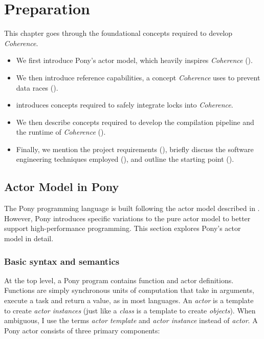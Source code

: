 \chapter{Preparation} \label{ch:preparation}

This chapter goes through the foundational concepts required to develop \textit{Coherence}.

\begin{itemize}
  \item We first introduce Pony's actor model\cite{pony_language}, which heavily inspires \textit{Coherence} ().
  \item We then introduce reference capabilities, a concept \textit{Coherence} uses to prevent data races (). 
  \item {} introduces concepts required to safely integrate locks into \textit{Coherence}.
  \item We then describe concepts required to develop the compilation pipeline and the runtime of \textit{Coherence} ().
  \item Finally, we mention the project requirements (), briefly discuss the software engineering techniques employed (), and outline the starting point ().
\end{itemize}

\section{Actor Model in Pony} \label{sec:actor_model_pony}

The Pony programming language\cite{pony_language} is built following the actor model described in . However, Pony introduces specific variations to the pure actor model to better support high-performance programming. This section explores Pony's actor model in detail.

\subsection{Basic syntax and semantics}
At the top level, a Pony program contains function and actor definitions. Functions are simply synchronous units of computation that take in arguments, execute a task and return a value, as in most languages. An \textit{actor} is a template to create \textit{actor instances} (just like a \textit{class} is a template to create \textit{objects}). When ambiguous, I use the terms \textit{actor template} and \textit{actor instance} instead of \textit{actor}. A Pony actor consists of three primary components:

